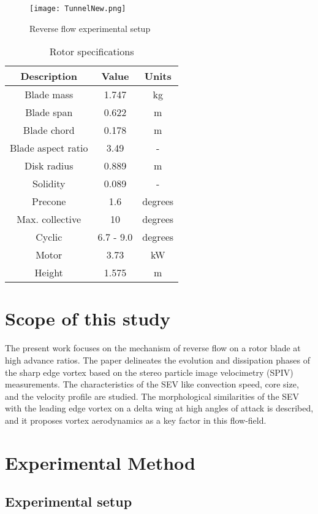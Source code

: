 \documentclass[%
 reprint,
 showkeys,
 amsmath,amssymb,
 aps,
]{revtex4-1}
\begin{document}
\begin{figure}[!t]
	\center
	\texttt{[image: TunnelNew.png]}
	\caption{Reverse flow experimental setup }
	\label{TunnelNew}
\end{figure}

\begin{table}[!ht]
	\centering
	\caption{Rotor specifications}
	\begin{tabular}{ |c||c|c| }
		\hline
		Description & Value & Units \\
		\hline
		Blade mass & 1.747 & kg \\
		Blade span & 0.622 & m \\
		Blade chord & 0.178 & m \\
		Blade aspect ratio & 3.49 & - \\
		Disk radius & 0.889 & m \\
		Solidity & 0.089 & - \\
		Precone & 1.6 & degrees \\
		Max. collective & 10 & degrees \\
		Cyclic & 6.7 - 9.0 & degrees \\
		Motor & 3.73 & kW \\
		Height & 1.575 & m \\
		\hline
	\end{tabular}
	
	\label{Tab:RotorSpecs}
\end{table}



\section{Scope of this study}
The present work focuses on the mechanism of reverse flow on a rotor blade at high advance ratios. The paper delineates the evolution and dissipation phases of the sharp edge vortex based on the stereo particle image velocimetry (SPIV) measurements. The  characteristics of the SEV like convection speed, core size, and the velocity profile are studied. The morphological similarities of the SEV with the leading edge vortex on a delta wing at high angles of attack is described, and it proposes vortex aerodynamics as a key factor in this flow-field. 

\section{Experimental Method}

\subsection{Experimental setup}
\end{document}
